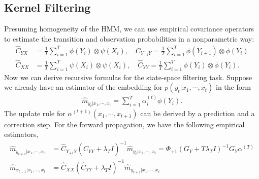 \documentclass[a4paper]{article}
\begin{document}
\subsection{Kernel Filtering}
Presuming homogeneity of the HMM, we can use empirical covariance operators to estimate the transition and observation probabilities in a nonparametric way:
\begin{align}
\hat{C}_{YX} &= \frac{1}{T}\sum_{i=1}^T \phi(Y_i)\otimes\psi(X_i),\quad \hat{C}_{Y_{+1}Y} = \frac{1}{T}\sum_{i=1}^T \phi(Y_{i+1})\otimes \phi(Y_i)\\
\hat{C}_{XX} &= \frac{1}{T}\sum_{i=1}^T \psi(X_i) \otimes \psi(X_i),\quad \hat{C}_{YY} = \frac{1}{T}\sum_{i=1}^T \phi(Y_i)\otimes\phi(Y_i).
\end{align}
Now we can derive recursive formulas for the state-space filtering task. Suppose we already have an estimator of the embedding for $p(y_t|x_1,\cdots,x_t)$ in the form
\begin{align}
\hat{m}_{y_t|x_1,\cdots,x_t} = \sum_{i=1}^T \alpha_i^{(t)} \phi(Y_i).
\end{align}
The update rule for $\alpha^{(t+1)}(x_1,\cdots,x_{t+1})$ can be derived by a prediction and a correction step. For the forward propagation, we have the following empirical estimators,
\begin{align}
\hat{m}_{y_{t+1}|x_1,\cdots,x_t} &= \hat{C}_{Y_{+1}Y}(\hat{C}_{YY}+\lambda_T I)^{-1}\hat{m}_{y_t|x_1,\cdots,x_t} = \Phi_{+1}(G_Y + T\lambda_T I)^{-1}G_Y \alpha^{(T)}\\
\hat{m}_{x_{t+1}|x_1,\cdots,x_t} &= \hat{C}_{XX}(\hat{C}_{YY} + \lambda_{T}I)^{-1}\hat{m}_{y_{t+1}|x_1,\cdots,x_t}
\end{align}

\end{document}
